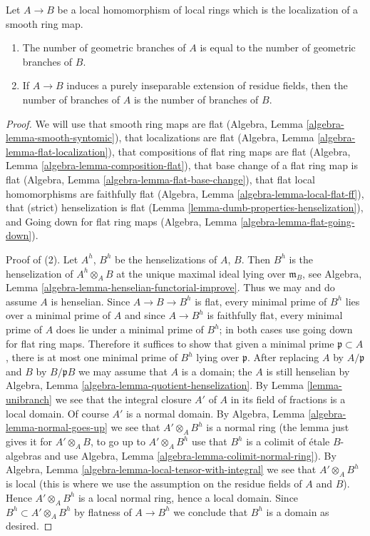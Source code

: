 \begin{lemma}
\label{lemma-invariance-number-branches-smooth}
Let $A \to B$ be a local homomorphism of local rings which
is the localization of a smooth ring map.
\begin{enumerate}
\item The number of geometric branches of $A$ is equal to the number
of geometric branches of $B$.
\item If $A \to B$ induces a purely inseparable extension of residue fields,
then the number of branches of $A$ is the number of branches of $B$.
\end{enumerate}
\end{lemma}

\begin{proof}
We will use that smooth ring maps are flat
(Algebra, Lemma \ref{algebra-lemma-smooth-syntomic}),
that localizations are flat (Algebra, Lemma
\ref{algebra-lemma-flat-localization}),
that compositions of flat ring maps are flat
(Algebra, Lemma \ref{algebra-lemma-composition-flat}),
that base change of a flat ring map is flat
(Algebra, Lemma \ref{algebra-lemma-flat-base-change}),
that flat local homomorphisms are faithfully flat
(Algebra, Lemma \ref{algebra-lemma-local-flat-ff}),
that (strict) henselization is flat
(Lemma \ref{lemma-dumb-properties-henselization}), and
Going down for flat ring maps
(Algebra, Lemma \ref{algebra-lemma-flat-going-down}).

\medskip\noindent
Proof of (2). Let $A^h$, $B^h$ be the henselizations of $A$, $B$. Then $B^h$
is the henselization of $A^h \otimes_A B$ at the unique
maximal ideal lying over $\mathfrak m_B$, see
Algebra, Lemma \ref{algebra-lemma-henselian-functorial-improve}.
Thus we may and do assume $A$ is henselian.
Since $A \to B \to B^h$ is flat, every minimal prime of $B^h$
lies over a minimal prime of $A$ and since $A \to B^h$ is faithfully flat,
every minimal prime of $A$ does lie under a minimal prime of $B^h$;
in both cases use going down for flat ring maps.
Therefore it suffices to show that given a minimal prime
$\mathfrak p \subset A$, there is at most one minimal prime
of $B^h$ lying over $\mathfrak p$.
After replacing $A$ by $A/\mathfrak p$ and $B$ by $B/\mathfrak p B$
we may assume that $A$ is a domain; the $A$ is still henselian by
Algebra, Lemma \ref{algebra-lemma-quotient-henselization}.
By Lemma \ref{lemma-unibranch} we see that the integral closure
$A'$ of $A$ in its field of fractions is a local domain.
Of course $A'$ is a normal domain. By
Algebra, Lemma \ref{algebra-lemma-normal-goes-up}
we see that $A' \otimes_A B^h$ is a normal ring
(the lemma just gives it for $A' \otimes_A B$, to go up to
$A' \otimes_A B^h$ use that $B^h$ is a colimit of \'etale
$B$-algebras and use Algebra, Lemma \ref{algebra-lemma-colimit-normal-ring}).
By Algebra, Lemma \ref{algebra-lemma-local-tensor-with-integral}
we see that $A' \otimes_A B^h$ is local (this is where we
use the assumption on the residue fields of $A$ and $B$).
Hence $A' \otimes_A B^h$ is a local normal ring, hence a local domain.
Since $B^h \subset A' \otimes_A B^h$ by flatness of $A \to B^h$
we conclude that $B^h$ is a domain as desired.


\end{proof}
